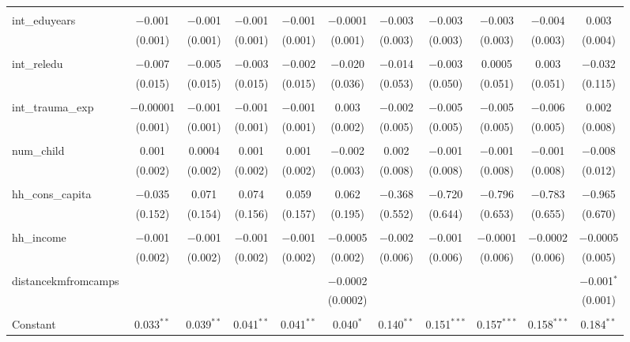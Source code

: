 \begin{table}[H]
\begin{tabular}{@{\extracolsep{4pt}}lcccccccccc}
  & & & & & & & & & & \\ 
 int\_eduyears & $-$0.001 & $-$0.001 & $-$0.001 & $-$0.001 & $-$0.0001 & $-$0.003 & $-$0.003 & $-$0.003 & $-$0.004 & 0.003 \\ 
  & (0.001) & (0.001) & (0.001) & (0.001) & (0.001) & (0.003) & (0.003) & (0.003) & (0.003) & (0.004) \\ 
  & & & & & & & & & & \\ 
 int\_reledu & $-$0.007 & $-$0.005 & $-$0.003 & $-$0.002 & $-$0.020 & $-$0.014 & $-$0.003 & 0.0005 & 0.003 & $-$0.032 \\ 
  & (0.015) & (0.015) & (0.015) & (0.015) & (0.036) & (0.053) & (0.050) & (0.051) & (0.051) & (0.115) \\ 
  & & & & & & & & & & \\ 
 int\_trauma\_exp & $-$0.00001 & $-$0.001 & $-$0.001 & $-$0.001 & 0.003 & $-$0.002 & $-$0.005 & $-$0.005 & $-$0.006 & 0.002 \\ 
  & (0.001) & (0.001) & (0.001) & (0.001) & (0.002) & (0.005) & (0.005) & (0.005) & (0.005) & (0.008) \\ 
  & & & & & & & & & & \\ 
 num\_child & 0.001 & 0.0004 & 0.001 & 0.001 & $-$0.002 & 0.002 & $-$0.001 & $-$0.001 & $-$0.001 & $-$0.008 \\ 
  & (0.002) & (0.002) & (0.002) & (0.002) & (0.003) & (0.008) & (0.008) & (0.008) & (0.008) & (0.012) \\ 
  & & & & & & & & & & \\ 
 hh\_cons\_capita & $-$0.035 & 0.071 & 0.074 & 0.059 & 0.062 & $-$0.368 & $-$0.720 & $-$0.796 & $-$0.783 & $-$0.965 \\ 
  & (0.152) & (0.154) & (0.156) & (0.157) & (0.195) & (0.552) & (0.644) & (0.653) & (0.655) & (0.670) \\ 
  & & & & & & & & & & \\ 
 hh\_income & $-$0.001 & $-$0.001 & $-$0.001 & $-$0.001 & $-$0.0005 & $-$0.002 & $-$0.001 & $-$0.0001 & $-$0.0002 & $-$0.0005 \\ 
  & (0.002) & (0.002) & (0.002) & (0.002) & (0.002) & (0.006) & (0.006) & (0.006) & (0.006) & (0.005) \\ 
  & & & & & & & & & & \\ 
 distancekmfromcamps &  &  &  &  & $-$0.0002 &  &  &  &  & $-$0.001$^{*}$ \\ 
  &  &  &  &  & (0.0002) &  &  &  &  & (0.001) \\ 
  & & & & & & & & & & \\ 
 Constant & 0.033$^{**}$ & 0.039$^{**}$ & 0.041$^{**}$ & 0.041$^{**}$ & 0.040$^{*}$ & 0.140$^{**}$ & 0.151$^{***}$ & 0.157$^{***}$ & 0.158$^{***}$ & 0.184$^{**}$ \\ 

\end{tabular}
\end{table}
